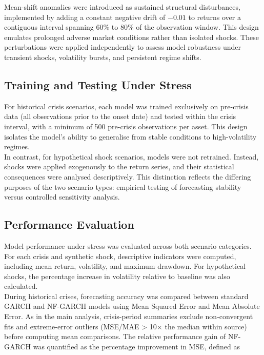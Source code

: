 \documentclass[oneside,12pt]{CUEDthesisPSnPDF}
\begin{document}
Mean-shift anomalies were introduced as sustained structural disturbances, implemented by adding a constant negative drift of $-0.01$ to returns over a contiguous interval spanning 60\% to 80\% of the observation window. This design emulates prolonged adverse market conditions rather than isolated shocks. These perturbations were applied independently to assess model robustness under transient shocks, volatility bursts, and persistent regime shifts.\\

\subsection{Training and Testing Under Stress}
\noindent
For historical crisis scenarios, each model was trained exclusively on pre-crisis data (all observations prior to the onset date) and tested within the crisis interval, with a minimum of 500 pre-crisis observations per asset. This design isolates the model’s ability to generalise from stable conditions to high-volatility regimes.\\

In contrast, for hypothetical shock scenarios, models were not retrained. Instead, shocks were applied exogenously to the return series, and their statistical consequences were analysed descriptively. This distinction reflects the differing purposes of the two scenario types: empirical testing of forecasting stability versus controlled sensitivity analysis.\\

\subsection{Performance Evaluation}
\noindent
Model performance under stress was evaluated across both scenario categories. For each crisis and synthetic shock, descriptive indicators were computed, including mean return, volatility, and maximum drawdown. For hypothetical shocks, the percentage increase in volatility relative to baseline was also calculated.\\

During historical crises, forecasting accuracy was compared between standard GARCH and NF-GARCH models using Mean Squared Error and Mean Absolute Error. As in the main analysis, crisis-period summaries exclude non-convergent fits and extreme-error outliers (MSE/MAE > 10$\times$ the median within source) before computing mean comparisons. The relative performance gain of NF-GARCH was quantified as the percentage improvement in MSE, defined as\\
\end{document}
